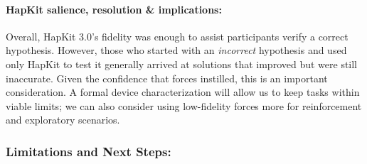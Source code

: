 


\paragraph{HapKit salience, resolution \& implications:}
Overall, HapKit 3.0's fidelity was enough to assist participants verify a correct hypothesis. 
However, those who started with an \textit{incorrect} hypothesis and used only HapKit to test it generally arrived at solutions that improved but were still inaccurate. 
Given the confidence that forces instilled, %
this is an important consideration.
%
 A formal device characterization will allow us to keep tasks within viable limits; 
  we can also consider using low-fidelity forces more for reinforcement and exploratory scenarios. %

 

 


\subsubsection{Limitations and Next Steps:}

